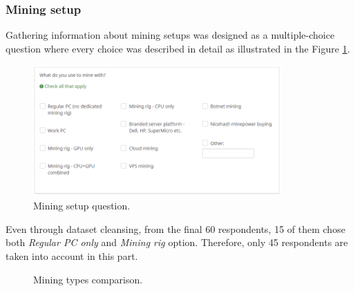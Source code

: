 \documentclass[
  printed, %
  table,   %
  lof,     %
  lot,     %
           oneside, color
]{fithesis3}
\begin{document}
\subsubsection{Mining setup}
Gathering information about mining setups was designed as a multiple-choice question where every choice was described in detail as illustrated in the Figure \ref{pic:miningquestion}. 

\begin{figure}[H]
\begin{center}

 \includegraphics[trim={0.5cm 1.7cm 0.5cm 0.5cm},clip,width=0.85\textwidth]{Screenshot_31.png}
    \caption{Mining setup question.}
    \label{pic:miningquestion}
\end{center}
    \end{figure}

Even through dataset cleansing, from the final 60 respondents, 15 of them chose both \textit{Regular PC only} and \textit{Mining rig} option. Therefore, only 45 respondents are taken into account in this part.
    

\begin{center}
\begin{figure}[H]
\caption{Mining types comparison.}
\label{chart:miningtype}\end{figure}\end{center}    
    
\end{document}
